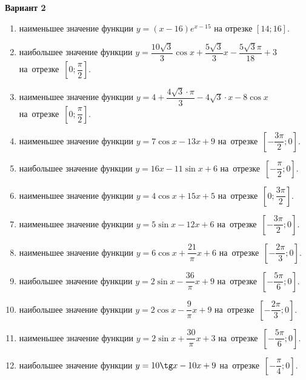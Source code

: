 \documentclass[a4paper,10pt]{article}
\begin{document}
\begin{center}\Large\textbf{Вариант 2}\end{center}

\begin{enumerate}
\item {} наименьшее значение функции $y=\left(x-16\right)e^{x-15}$ на отрезке $\left[14;16\right]$.

\item {} наибольшее значение функции $y=\dfrac{10\sqrt{3}}{3}\cos x+\dfrac{5\sqrt{3}}{3}x-\dfrac{5\sqrt{3}\pi }{18}+3$ на~отрезке~$\left[0;\dfrac{\pi }{2}\right]$.

\item {} наименьшее значение функции $y=4+\dfrac{4\sqrt{3}\cdot\pi}{3}-4\sqrt{3}\cdot x-8\cos x$ на~отрезке~$\left[0;\dfrac{\pi }{2}\right]$.

\item {} наименьшее значение функции $y=7\cos x-13x+9$ на~отрезке~$\left[-\dfrac{3\pi }{2};0\right]$.

\item {} наибольшее значение функции $y=16x-11\sin x+6$ на~отрезке~$\left[-\dfrac{\pi }{2};0\right]$.

\item {} наименьшее значение функции $y=4\cos x+15x+5$ на~отрезке~$\left[0;\dfrac{3\pi }{2}\right]$.

\item {} наименьшее значение функции $y=5\sin x-12x+6$ на~отрезке~$\left[-\dfrac{3\pi }{2};0\right]$.

\item {} наименьшее значение функции $y=6\cos x+\dfrac{21}{\pi }x+6$ на~отрезке~$\left[-\dfrac{2\pi }{3};0\right]$.

\item {} наибольшее значение функции $y=2\sin x-\dfrac{36}{\pi }x+9$ на~отрезке~$\left[-\dfrac{5\pi }{6};0\right]$.

\item {} наибольшее значение функции $y=2\cos x-\dfrac{9}{\pi }x+9$ на~отрезке~$\left[-\dfrac{2\pi }{3};0\right]$.

\item {} наименьшее значение функции $y=2\sin x+\dfrac{30}{\pi }x+3$ на~отрезке~$\left[-\dfrac{5\pi }{6};0\right]$.

\item {} наибольшее значение функции $y=10\tg x-10x+9$ на~отрезке~$\left[-\dfrac{\pi }{4};0\right]$.


\end{enumerate}
\end{document}
